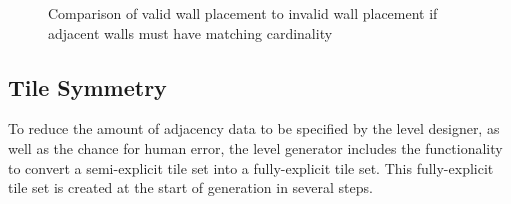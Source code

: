 \begin{figure}[H]
    \caption{Comparison of valid wall placement to invalid wall placement if adjacent walls must have matching cardinality}
    \label{fig:wallExample}
\end{figure}

\subsection{Tile Symmetry}\label{sec:tileSymmetry}
To reduce the amount of adjacency data to be specified by the level designer, as well as the chance for human error, the level generator includes the functionality to convert a semi-explicit tile set into a fully-explicit tile set. This fully-explicit tile set is created at the start of generation in several steps.


